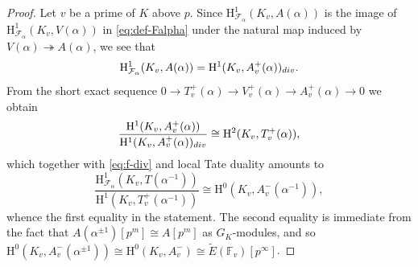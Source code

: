 \documentclass[10pt,a4paper]{amsart}
\newcommand{\Fcal}{\mathcal{F}}
\newcommand{\Z}{\mathbb{Z}}
\newcommand{\rH}{\mathrm{H}}
\begin{document}
\begin{proof}
Let $v$ be a prime of $K$ above $p$. 
Since $\rH^1_{\Fcal_\alpha}(K_v,A(\alpha))$ is the image of $\rH^1_{\Fcal_\alpha}(K_v,V(\alpha))$ in \eqref{eq:def-Falpha} under the natural map %
induced by $V(\alpha)\twoheadrightarrow A(\alpha)$, we see that
\begin{equation}\label{eq:f-div}
\rH^1_{\Fcal_\alpha}(K_v,A(\alpha))=\rH^1(K_v,A_v^+(\alpha))_{\rm div}.
\end{equation}
From the short exact sequence $0 \to T_v^+(\alpha) \to V_v^+(\alpha) \to A_v^+(\alpha) \to 0$ we obtain
\[
\frac{\rH^1(K_v,A_v^+(\alpha))}{\rH^1(K_v,A_v^+(\alpha))_{\rm div}}\cong \rH^2(K_v, T_v^+(\alpha)),
\]
which together with \eqref{eq:f-div} and local Tate duality amounts to
\[
\frac{\rH^1_{\Fcal_\alpha}(K_v,T(\alpha^{-1}))}{\rH^1(K_v,T_v^+(\alpha^{-1}))}\cong\rH^0(K_v,A_v^-(\alpha^{-1})),
\]
whence the first equality in the statement. The second equality is immediate from the fact that $A(\alpha^{\pm{1}})[p^m]\cong A[p^m]$ as $G_K$-modules, and so $\rH^0(K_v,A_v^-(\alpha^{\pm{1}}))\cong\rH^0(K_v,A_v^-)\cong \widetilde{E}(\mathbb{F}_v)[p^\infty]$.
%

\end{proof}
\end{document}

